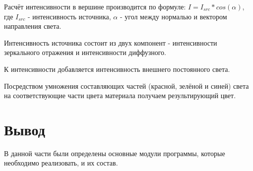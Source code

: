 Расчёт интенсивности в вершине производится по формуле: $I = I_{src} * cos(\alpha)$, где $I_{src}$ - интенсивность источника, $\alpha$ - угол между нормалью и вектором направления света.

Интенсивность источника состоит из двух компонент - интенсивности зеркального отражения и интенсивности диффузного.

К интенсивности добавляется интенсивность внешнего постоянного света.

Посредством умножения составляющих частей (красной, зелёной и синей) света на соответствующие части
цвета материала получаем результирующий цвет.
\section{Вывод}

В данной части были определены основные модули программы, которые необходимо реализовать, и их состав.
